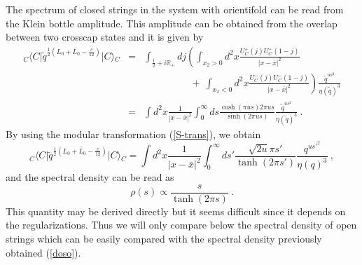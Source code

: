 \documentclass[a4paper,12pt]{article}
\newcommand{\br}{\mathbb R}
\newcommand{\ket}[1]{{|#1\rangle}{}}
\newcommand{\bra}[1]{{\langle#1|}}
\newcommand{\tq}{\tilde{q}}
\newcommand{\nn}{\nonumber\\}
\begin{document}
The spectrum of closed strings in the system with orientifold can be
read from the Klein bottle amplitude. This amplitude can be obtained
from the overlap between two crosscap states and it is given by
\begin{eqnarray}
{}_C \bra{C} 
 \tq^{\frac{1}{2}(L_0 + \bar{L}_0 - \frac{c}{12})} 
   \ket{C}_C &=& \int_{\frac{1}{2}+ i \br_+} dj \left(
 \int_{x_2 > 0} d^2 x 
 \frac{U^+_{C}(j) U^+ _{C} (1-j)}{|x-\bar{x}|^2} 
   \right. \nn && \hspace{2cm} +~ \left.
 \int_{x_2 < 0} d^2 x 
 \frac{U^-_{C}(j) U^-_{C} (1-j)}{|x-\bar{x}|^2} 
\right) \frac{ \tq^{us^2}}{\eta (\tq)^3} \nn
&=& \int d^2 x \frac{1}{|x - \bar{x}|^2} \int^{\infty}_0 d s 
   \frac{\cosh ( \pi u s) 2 \pi u s}{\sinh (2 \pi u s)}
   \frac{ \tq^{us^2}}{\eta(\tq)^3 } ~.
\end{eqnarray} 
By using the modular transformation (\ref{S-trans}), we obtain
\begin{equation}
 {}_C \bra{C} 
 \tq^{\frac{1}{2}(L_0 + \bar{L}_0 - \frac{c}{12})} 
   \ket{C}_C =  \int d^2 x \frac{ 1 }{| x - \bar{x} |^2}
   \int ^{\infty} _0 d s' \frac{  \sqrt{2u} \pi s'}{
   \tanh (2 \pi s')}
   \frac{ q^{u{s'}^2}}{\eta (q)^3}~,
\end{equation} 
and the spectral density can be read as
\begin{equation}
 \rho (s) \propto  \frac{s}{
   \tanh (2 \pi s)} ~.
\end{equation}   
This quantity may be derived directly but it seems difficult since it
depends on the regularizations. 
Thus we will only compare below the spectral density of open strings
which can be easily compared with the spectral density previously
obtained (\ref{doso}). 
\end{document}
